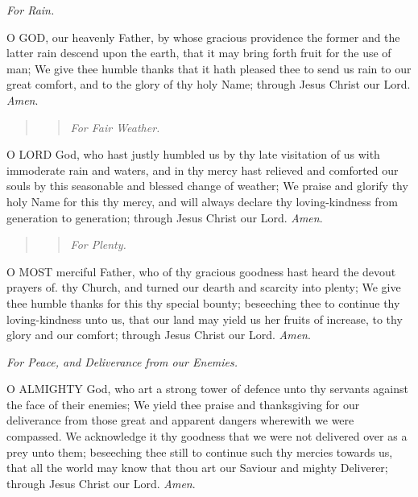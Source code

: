 \emph{For Rain.}

O
GOD, our heavenly Father, by whose gracious providence the former and
the latter rain descend upon the earth, that it may bring forth fruit
for the use of man; We give thee humble thanks that it hath pleased thee
to send us rain to our great comfort, and to the glory of thy holy Name;
through Jesus Christ our Lord. \emph{Amen}.

\begin{quote}

\begin{quote}

\emph{For
Fair Weather.}

\end{quote}

\end{quote}

O
LORD God, who hast justly humbled us by thy late visitation of us with
immoderate rain and waters, and in thy mercy hast relieved and comforted
our souls by this seasonable and blessed change of weather; We praise
and glorify thy holy Name for this thy mercy, and will always declare
thy loving-kindness from generation to generation; through Jesus Christ
our Lord. \emph{Amen}.

\begin{quote}

\begin{quote}

\emph{For
Plenty.}

\end{quote}

\end{quote}

O
MOST merciful Father, who of thy gracious goodness hast heard the devout
prayers of. thy Church, and turned our dearth and scarcity into plenty;
We give thee humble thanks for this thy special bounty; beseeching thee
to continue thy loving-kindness unto us, that our land may yield us her
fruits of increase, to thy glory and our comfort; through Jesus Christ
our Lord. \emph{Amen}.

\emph{For
Peace, and Deliverance from our Enemies.}

O
ALMIGHTY God, who art a strong tower of defence unto thy servants against
the face of their enemies; We yield thee praise and thanksgiving for our
deliverance from those great and apparent dangers wherewith we were compassed.
We acknowledge it thy goodness that we were not delivered over as a prey
unto them; beseeching thee still to continue such thy mercies towards
us, that all the world may know that thou art our Saviour and mighty Deliverer;
through Jesus Christ our Lord. \emph{Amen}.

